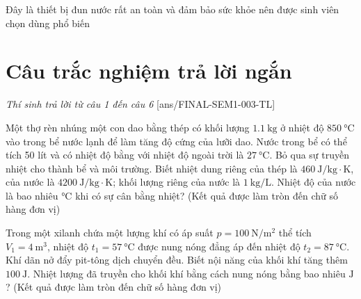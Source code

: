 \begin{ex}
	{Đây là thiết bị đun nước rất an toàn và đảm bảo sức khỏe nên được sinh viên chọn dùng phổ biến}
\end{ex}
\section{Câu trắc nghiệm trả lời ngắn} \textit{Thí sinh trả lời từ câu 1 đến câu 6}
\setcounter{ex}{0}
[ans/FINAL-SEM1-003-TL]
\begin{ex}
	Một thợ rèn nhúng một con dao bằng thép có khối lượng $\SI{1.1}{\kilogram}$ ở nhiệt độ $\SI{850}{\celsius}$ vào trong bể nước lạnh để làm tăng độ cứng của lưỡi dao. Nước trong bể có thể tích 50 lít và có nhiệt độ bằng với nhiệt độ ngoài trời là $\SI{27}{\celsius}$. Bỏ qua sự truyền nhiệt cho thành bể và môi trường. Biết nhiệt dung riêng của thép là $\SI{460}{\joule/\kilogram\cdot\kelvin}$, của nước là $\SI{4200}{\joule/\kilogram\cdot\kelvin}$; khối lượng riêng của nước là $\SI{1}{\kilogram/\liter}$. Nhiệt độ của nước là bao nhiêu $\si{\celsius}$ khi có sự cân bằng nhiệt? (Kết quả được làm tròn đến chữ số hàng đơn vị)
	\loigiai{
		
	}
\end{ex}
\begin{ex}
	Trong một xilanh chứa một lượng khí có áp suất $p=\SI{100}{\newton/\meter^2}$ thể tích $V_1=\SI{4}{\meter^3}$, nhiệt độ $t_1=\SI{57}{\celsius}$ được nung nóng đẳng áp đến nhiệt độ $t_2=\SI{87}{\celsius}$. Khí dãn nở đẩy pit-tông dịch chuyển đều. Biết nội năng của khối khí tăng thêm $\SI{100}{\joule}$. Nhiệt lượng đã truyền cho khối khí bằng cách nung nóng bằng bao nhiêu $\si{\joule}$? (Kết quả được làm tròn đến chữ số hàng đơn vị)
\end{ex}
